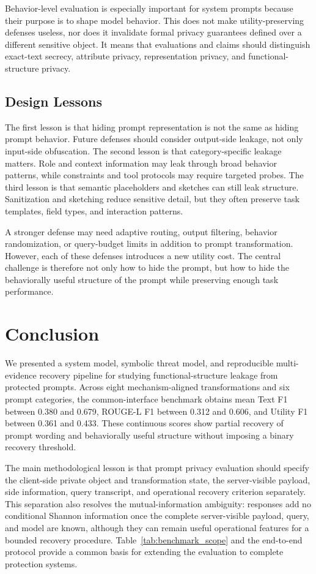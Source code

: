 \documentclass[letterpaper]{article} %
\begin{document}
Behavior-level evaluation is especially important for system prompts because their purpose is to shape model behavior.  This does not make utility-preserving defenses useless, nor does it invalidate formal privacy guarantees defined over a different sensitive object.  It means that evaluations and claims should distinguish exact-text secrecy, attribute privacy, representation privacy, and functional-structure privacy.

\subsection{Design Lessons}

The first lesson is that hiding prompt representation is not the same as hiding prompt behavior.  Future defenses should consider output-side leakage, not only input-side obfuscation.  The second lesson is that category-specific leakage matters.  Role and context information may leak through broad behavior patterns, while constraints and tool protocols may require targeted probes.  The third lesson is that semantic placeholders and sketches can still leak structure.  Sanitization and sketching reduce sensitive detail, but they often preserve task templates, field types, and interaction patterns.

A stronger defense may need adaptive routing, output filtering, behavior randomization, or query-budget limits in addition to prompt transformation.  However, each of these defenses introduces a new utility cost.  The central challenge is therefore not only how to hide the prompt, but how to hide the behaviorally useful structure of the prompt while preserving enough task performance.

\section{Conclusion}

We presented a system model, symbolic threat model, and reproducible multi-evidence recovery pipeline for studying functional-structure leakage from protected prompts.  Across eight mechanism-aligned transformations and six prompt categories, the common-interface benchmark obtains mean Text F1 between 0.380 and 0.679, ROUGE-L F1 between 0.312 and 0.606, and Utility F1 between 0.361 and 0.433.  These continuous scores show partial recovery of prompt wording and behaviorally useful structure without imposing a binary recovery threshold.

The main methodological lesson is that prompt privacy evaluation should specify the client-side private object and transformation state, the server-visible payload, side information, query transcript, and operational recovery criterion separately.  This separation also resolves the mutual-information ambiguity: responses add no conditional Shannon information once the complete server-visible payload, query, and model are known, although they can remain useful operational features for a bounded recovery procedure.  Table~\ref{tab:benchmark_scope} and the end-to-end protocol provide a common basis for extending the evaluation to complete protection systems.



\end{document}
